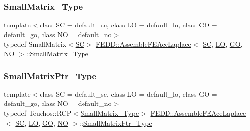 \mbox{\label{classFEDD_1_1AssembleFEAceLaplace_a73514efbfcde00f29ef48aaffc8f964a}} 
\subsubsection{\texorpdfstring{Small\+Matrix\+\_\+\+Type}{SmallMatrix\_Type}}
{\footnotesize\ttfamily template$<$class SC  = default\+\_\+sc, class LO  = default\+\_\+lo, class GO  = default\+\_\+go, class NO  = default\+\_\+no$>$ \\
typedef Small\+Matrix$<$\hyperlink{fe__test__laplace_8cpp_a79c7e86a57edbb2a5a53242bcd04e41e}{SC}$>$ \hyperlink{classFEDD_1_1AssembleFEAceLaplace}{F\+E\+D\+D\+::\+Assemble\+F\+E\+Ace\+Laplace}$<$ \hyperlink{fe__test__laplace_8cpp_a79c7e86a57edbb2a5a53242bcd04e41e}{SC}, \hyperlink{fe__test__laplace_8cpp_ad6a38c9f07d3fd633eefca5bccad8410}{LO}, \hyperlink{fe__test__laplace_8cpp_afa2946b509009b4f45eb04bd8c5b27d9}{GO}, \hyperlink{fe__test__laplace_8cpp_a5e24f37b28787429872b6ecb1d0417ce}{NO} $>$\+::\hyperlink{classFEDD_1_1AssembleFE_a8b8c588ba0cfaa200a74215f19e62722}{Small\+Matrix\+\_\+\+Type}}

\mbox{\label{classFEDD_1_1AssembleFEAceLaplace_a80f37a68305eda24e2cd99eba578109b}} 
\subsubsection{\texorpdfstring{Small\+Matrix\+Ptr\+\_\+\+Type}{SmallMatrixPtr\_Type}}
{\footnotesize\ttfamily template$<$class SC  = default\+\_\+sc, class LO  = default\+\_\+lo, class GO  = default\+\_\+go, class NO  = default\+\_\+no$>$ \\
typedef Teuchos\+::\+R\+CP$<$\hyperlink{classFEDD_1_1AssembleFE_a8b8c588ba0cfaa200a74215f19e62722}{Small\+Matrix\+\_\+\+Type}$>$ \hyperlink{classFEDD_1_1AssembleFEAceLaplace}{F\+E\+D\+D\+::\+Assemble\+F\+E\+Ace\+Laplace}$<$ \hyperlink{fe__test__laplace_8cpp_a79c7e86a57edbb2a5a53242bcd04e41e}{SC}, \hyperlink{fe__test__laplace_8cpp_ad6a38c9f07d3fd633eefca5bccad8410}{LO}, \hyperlink{fe__test__laplace_8cpp_afa2946b509009b4f45eb04bd8c5b27d9}{GO}, \hyperlink{fe__test__laplace_8cpp_a5e24f37b28787429872b6ecb1d0417ce}{NO} $>$\+::\hyperlink{classFEDD_1_1AssembleFE_afb5fb5dca3aab59f697a25884e99e894}{Small\+Matrix\+Ptr\+\_\+\+Type}}



